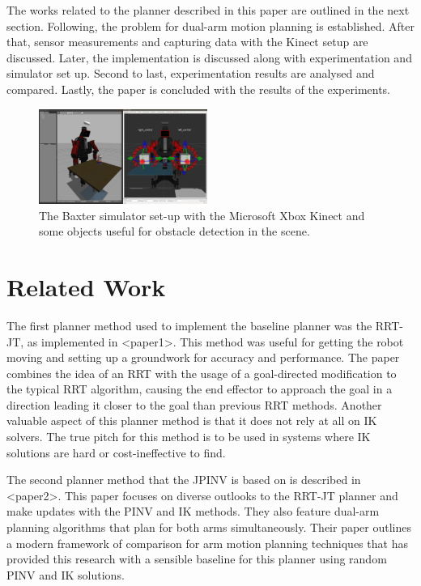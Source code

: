 \documentclass[conference]{IEEEtran} \usepackage[T1]{fontenc} \usepackage[backend=biber, style=ieee]{biblatex}
\begin{document}
The works related to the planner described in this paper are outlined in the next section. Following, the problem for dual-arm motion planning is established. After that, sensor measurements and capturing data with the Kinect setup are discussed. Later, the implementation is discussed along with experimentation and simulator set up. Second to last, experimentation results are analysed and compared. Lastly, the paper is concluded with the results of the experiments.

\begin{figure}
\label{pic1} 
\centering 
\includegraphics[width=0.49\textwidth]{sim1}
\caption{The Baxter simulator set-up with the Microsoft Xbox Kinect and some objects useful for obstacle detection in the scene.}
\end{figure}

\section{Related Work} \label{Related Work}

The first planner method used to implement the baseline planner was the RRT-JT, as implemented in <paper1>. This method was useful for getting the robot moving
and setting up a groundwork for accuracy and performance. The paper combines the idea of an RRT with the usage of a goal-directed modification to the typical
RRT algorithm, causing the end effector to approach the goal in a direction leading it closer to the goal than previous RRT methods. Another valuable aspect of 
this planner method is that it does not rely at all on IK solvers. The true pitch for this method is to be used in systems where IK solutions are hard or 
cost-ineffective to find.

The second planner method that the JPINV is based on is described in <paper2>. This paper focuses on diverse outlooks to the RRT-JT planner and make updates with the PINV and IK methods. They also feature dual-arm planning algorithms that plan for both arms simultaneously. Their paper outlines a modern framework of comparison for arm motion planning techniques that has provided this research with a sensible baseline for this planner using random PINV and IK solutions.
\end{document}
